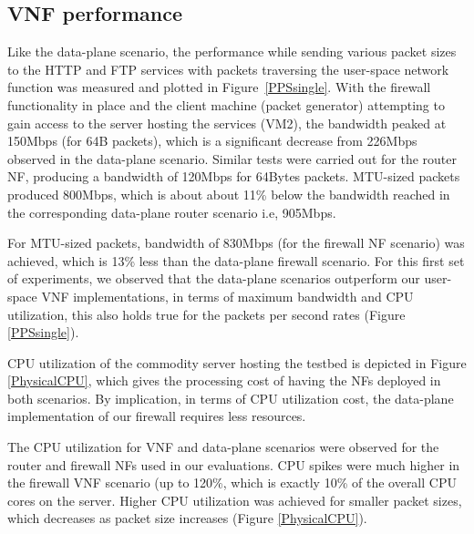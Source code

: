 \documentclass[conference]{IEEEtran}
\begin{document}
\subsection{VNF performance}
\label{vnfperformance}
Like the data-plane scenario, the performance while sending various packet sizes to the HTTP and FTP services with packets traversing the user-space network function %
was measured and plotted in Figure~\ref{PPSsingle}. 
With the firewall functionality in place and the client machine (packet generator) attempting to gain access to the server hosting the services (VM2), the bandwidth peaked at 150Mbps (for 64B packets), which is a significant decrease from 226Mbps observed in the data-plane scenario. Similar tests were carried out for the router NF, producing a bandwidth of 120Mbps for 64Bytes packets. MTU-sized packets produced 800Mbps, which is about about 11\% below the bandwidth reached in the corresponding data-plane router scenario i.e, 905Mbps. 

For MTU-sized packets, bandwidth of 830Mbps (for the firewall NF scenario) was achieved, which is 13\% less than the data-plane firewall scenario. For this first set of experiments, we observed that the data-plane scenarios outperform our user-space VNF implementations, in terms of maximum bandwidth and CPU utilization, this also holds true for the packets per second rates (Figure \ref{PPSsingle}). 

CPU utilization of the commodity server hosting the testbed is depicted in Figure \ref{PhysicalCPU}, which gives the processing cost of having the NFs deployed in both scenarios. 
By implication, in terms of CPU utilization cost, the data-plane implementation of our firewall requires less resources.

 The CPU utilization for VNF and data-plane scenarios were observed for the router and firewall NFs used in our evaluations. CPU spikes were much higher in the firewall VNF scenario (up to 120\%, which is exactly 10\% of the overall CPU cores on the server. Higher CPU utilization was achieved for smaller packet sizes, which decreases as packet size increases (Figure \ref{PhysicalCPU}).
 
\end{document}
